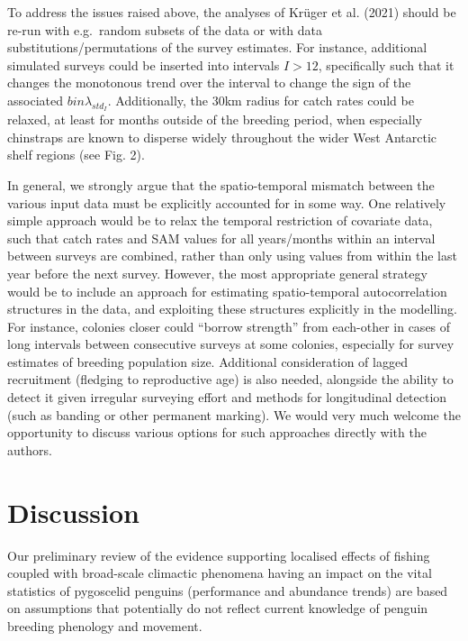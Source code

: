\documentclass[]{elsarticle} %
\begin{document}
To address the issues raised above, the analyses of Krüger et al. (2021)
should be re-run with e.g.~random subsets of the data or with data
substitutions/permutations of the survey estimates. For instance,
additional simulated surveys could be inserted into intervals \(I>12\),
specifically such that it changes the monotonous trend over the interval
to change the sign of the associated \(bin\lambda_{std_I}\).
Additionally, the 30km radius for catch rates could be relaxed, at least
for months outside of the breeding period, when especially chinstraps
are known to disperse widely throughout the wider West Antarctic shelf
regions (see Fig. 2).

In general, we strongly argue that the spatio-temporal mismatch between
the various input data must be explicitly accounted for in some way. One
relatively simple approach would be to relax the temporal restriction of
covariate data, such that catch rates and SAM values for all
years/months within an interval between surveys are combined, rather
than only using values from within the last year before the next survey.
However, the most appropriate general strategy would be to include an
approach for estimating spatio-temporal autocorrelation structures in
the data, and exploiting these structures explicitly in the modelling.
For instance, colonies closer could ``borrow strength'' from each-other
in cases of long intervals between consecutive surveys at some colonies,
especially for survey estimates of breeding population size. Additional
consideration of lagged recruitment (fledging to reproductive age) is
also needed, alongside the ability to detect it given irregular
surveying effort and methods for longitudinal detection (such as banding
or other permanent marking). We would very much welcome the opportunity
to discuss various options for such approaches directly with the
authors.

\hypertarget{discussion}{%
\section{Discussion}\label{discussion}}

Our preliminary review of the evidence supporting localised effects of
fishing coupled with broad-scale climactic phenomena having an impact on
the vital statistics of pygoscelid penguins (performance and abundance
trends) are based on assumptions that potentially do not reflect current
knowledge of penguin breeding phenology and movement.
\end{document}
